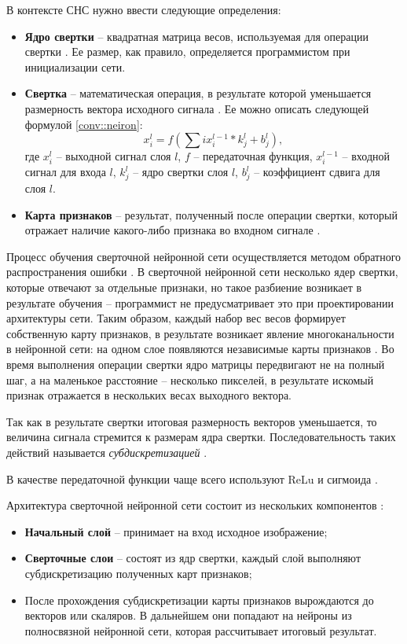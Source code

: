 В контексте СНС нужно ввести следующие определения:
\begin{itemize}
	\item \textbf{Ядро свертки} -- квадратная матрица весов, используемая для операции свертки \cite{CNN_2}. 
	Ее размер, как правило, определяется программистом при инициализации сети.
	\item \textbf{Свертка} -- математическая операция, в результате которой уменьшается размерность вектора исходного сигнала \cite{CNN_arch}.
	Ее можно описать следующей формулой \eqref{conv::neiron}:
	\begin{equation}
	  	\label{conv::neiron}
	  	x_{i}^{l} = f(\sum{}{i} x_{i}^{l-1} * k_{j}^{l} + b_{j}^{l}),
	\end{equation}
	где $x_{i}^{l}$ -- выходной сигнал слоя $l$, $f$ -- передаточная функция, $x_{i}^{l-1}$ -- входной сигнал для входа $l$,
	$k_{j}^{l}$ -- ядро свертки слоя $l$, $b_{j}^{l}$ -- коэффициент сдвига для слоя $l$.
	
	\item \textbf{Карта признаков} -- результат, полученный после операции свертки, который отражает наличие какого-либо признака во входном сигнале \cite{CNN_arch}.
\end{itemize}

Процесс обучения сверточной нейронной сети осуществляется методом обратного распространения ошибки \cite{CNN_arch}.
В сверточной нейронной сети несколько ядер свертки, которые отвечают за отдельные признаки, но такое разбиение возникает в результате обучения -- программист не предусматривает это при проектировании архитектуры сети.
Таким образом, каждый набор вес весов формирует собственную карту признаков, в результате возникает явление многоканальности в нейронной сети: на одном слое появляются независимые карты признаков \cite{CNN_pool}. 
Во время выполнения операции свертки ядро матрицы передвигают не на полный шаг, а на маленькое расстояние -- несколько пикселей, в результате искомый признак отражается в нескольких весах выходного вектора.

Так как в результате свертки итоговая размерность векторов уменьшается, то величина сигнала стремится к размерам ядра свертки.
Последовательность таких действий называется \textit{субдискретизацией} \cite{CNN_pool}.

В качестве передаточной функции чаще всего используют ReLu и сигмоида \cite{CNN_pool}.

Архитектура сверточной нейронной сети состоит из нескольких компонентов \cite{CNN_research}:
\begin{itemize}
	\item \textbf{Начальный слой} -- принимает на вход исходное изображение;
	\item \textbf{Сверточные слои} -- состоят из ядр свертки, каждый слой выполняют субдискретизацию полученных карт признаков;
	\item После прохождения субдискретизации карты признаков вырождаются до векторов или скаляров. 
	В дальнейшем они попадают на нейроны из полносвязной нейронной сети, которая рассчитывает итоговый результат.
\end{itemize}

